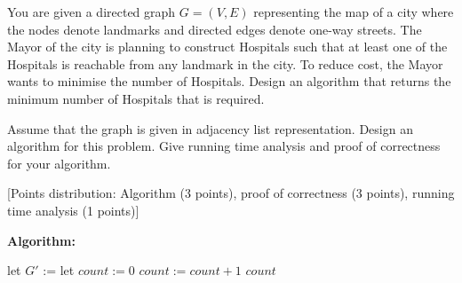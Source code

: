 \documentclass[answers]{exam}
\newenvironment{answer}{%
     \renewcommand{\solutiontitle}{\noindent\textbf{Answer:}\enspace}
     \begin{solution}
     }{%
     \end{solution}
     \renewcommand{\solutiontitle}{\noindent\textbf{Solution:}\enspace}
 }
\begin{document}
\begin{questions}

\question[7]
You are given a directed graph $G=(V,E)$ representing the map of a city where the nodes denote landmarks and directed edges denote one-way streets. The Mayor of the city is planning to construct Hospitals such that at least one of the Hospitals is reachable from any landmark in the city. To reduce cost, the Mayor wants to minimise the number of Hospitals. Design an algorithm that returns the minimum number of Hospitals that is required.

Assume that the graph is given in adjacency list representation. Design an algorithm for this problem. Give running time analysis and proof of correctness for your algorithm.

[Points distribution: Algorithm (3 points), proof of correctness (3 points), running time analysis (1 points)]

\begin{solution}

\textbf{Algorithm:}

    \begin{algorithmic}
            \State let $G'$ := 
            \State let $count := 0$
                 
                    \State $count := count + 1$
                \EndIf
            \EndFor
            \State \Return $count$
        \EndFunction
    \end{algorithmic}



\end{solution}
\end{questions}
\end{document}
